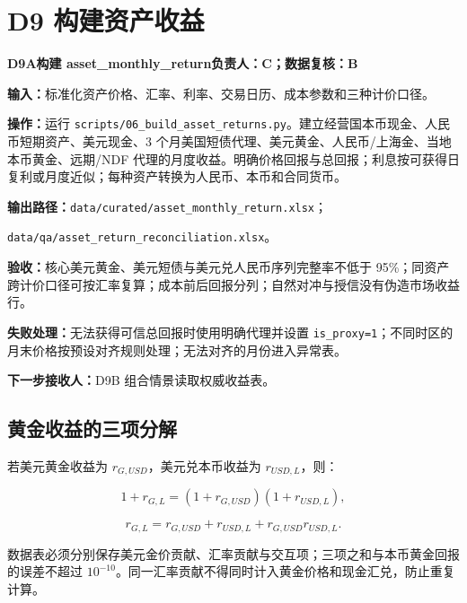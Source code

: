\documentclass[UTF8,fontset=windows,12pt,openany]{ctexbook}
\newcommand{\Field}[1]{{\small\nolinkurl{#1}}}
\newcommand{\File}[1]{{\small\begingroup\urlstyle{same}\nolinkurl{#1}\endgroup}}
\newcommand{\StepTitle}[3]{%
  \noindent\colorbox{DeepNavy}{\parbox{0.965\textwidth}{\color{white}\Large\bfseries #1\quad #2\hfill\normalsize #3}}\par\medskip
}
\newcommand{\CardRow}[2]{\noindent\textbf{#1：}#2\par}
\begin{document}
\newpage
\section{D9 构建资产收益}
\StepTitle{D9A}{构建 asset\_monthly\_return}{负责人：C；数据复核：B}
\CardRow{输入}{标准化资产价格、汇率、利率、交易日历、成本参数和三种计价口径。}
\CardRow{操作}{运行 \File{scripts/06_build_asset_returns.py}。建立经营国本币现金、人民币短期资产、美元现金、3 个月美国短债代理、美元黄金、人民币/上海金、当地本币黄金、远期/NDF 代理的月度收益。明确价格回报与总回报；利息按可获得日复利或月度近似；每种资产转换为人民币、本币和合同货币。}
\CardRow{输出路径}{\File{data/curated/asset_monthly_return.xlsx}；\par\File{data/qa/asset_return_reconciliation.xlsx}。}
\CardRow{验收}{核心美元黄金、美元短债与美元兑人民币序列完整率不低于 95\%；同资产跨计价口径可按汇率复算；成本前后回报分列；自然对冲与授信没有伪造市场收益行。}
\CardRow{失败处理}{无法获得可信总回报时使用明确代理并设置 \Field{is_proxy=1}；不同时区的月末价格按预设对齐规则处理；无法对齐的月份进入异常表。}
\CardRow{下一步接收人}{D9B 组合情景读取权威收益表。}

\subsection{黄金收益的三项分解}

若美元黄金收益为 \(r_{G,USD}\)，美元兑本币收益为 \(r_{USD,L}\)，则：

\begin{equation}
1+r_{G,L}=(1+r_{G,USD})(1+r_{USD,L}),
\end{equation}

\begin{equation}
r_{G,L}=r_{G,USD}+r_{USD,L}+r_{G,USD}r_{USD,L}.
\end{equation}

数据表必须分别保存美元金价贡献、汇率贡献与交互项；三项之和与本币黄金回报的误差不超过 \(10^{-10}\)。同一汇率贡献不得同时计入黄金价格和现金汇兑，防止重复计算。

\newpage
\end{document}
